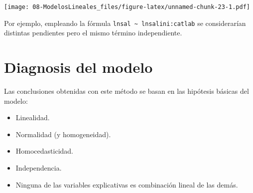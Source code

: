 \documentclass[]{book}
\newenvironment{Shaded}{\begin{snugshade}}{\end{snugshade}}
\newcommand{\DataTypeTok}[1]{\textcolor[rgb]{0.13,0.29,0.53}{#1}}
\newcommand{\DecValTok}[1]{\textcolor[rgb]{0.00,0.00,0.81}{#1}}
\newcommand{\KeywordTok}[1]{\textcolor[rgb]{0.13,0.29,0.53}{\textbf{#1}}}
\newcommand{\NormalTok}[1]{#1}
\newcommand{\OperatorTok}[1]{\textcolor[rgb]{0.81,0.36,0.00}{\textbf{#1}}}
\newcommand{\StringTok}[1]{\textcolor[rgb]{0.31,0.60,0.02}{#1}}
\begin{document}
\begin{Shaded}
\end{Shaded}

\texttt{[image: 08-ModelosLineales\_files/figure-latex/unnamed-chunk-23-1.pdf]}

Por ejemplo, empleando la fórmula \texttt{lnsal\ \textasciitilde{}\ lnsalini:catlab} se considerarían distintas pendientes pero el mismo término independiente.

\hypertarget{diagnosis-del-modelo}{%
\section{Diagnosis del modelo}\label{diagnosis-del-modelo}}

Las conclusiones obtenidas con este método se basan en las hipótesis básicas del modelo:

\begin{itemize}
\item
  Linealidad.
\item
  Normalidad (y homogeneidad).
\item
  Homocedasticidad.
\item
  Independencia.
\item
  Ninguna de las variables explicativas es combinación lineal de
  las demás.
\end{itemize}
\end{document}

